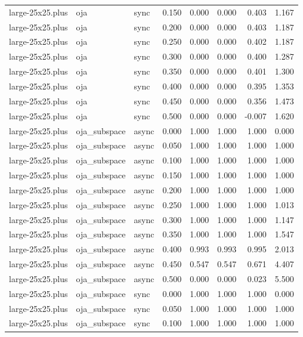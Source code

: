 \begin{tabular}{lllrrrrr}
large-25x25.plus & oja & sync & 0.150 & 0.000 & 0.000 & 0.403 & 1.167 \\
large-25x25.plus & oja & sync & 0.200 & 0.000 & 0.000 & 0.403 & 1.187 \\
large-25x25.plus & oja & sync & 0.250 & 0.000 & 0.000 & 0.402 & 1.187 \\
large-25x25.plus & oja & sync & 0.300 & 0.000 & 0.000 & 0.400 & 1.287 \\
large-25x25.plus & oja & sync & 0.350 & 0.000 & 0.000 & 0.401 & 1.300 \\
large-25x25.plus & oja & sync & 0.400 & 0.000 & 0.000 & 0.395 & 1.353 \\
large-25x25.plus & oja & sync & 0.450 & 0.000 & 0.000 & 0.356 & 1.473 \\
large-25x25.plus & oja & sync & 0.500 & 0.000 & 0.000 & -0.007 & 1.620 \\
large-25x25.plus & oja\_subspace & async & 0.000 & 1.000 & 1.000 & 1.000 & 0.000 \\
large-25x25.plus & oja\_subspace & async & 0.050 & 1.000 & 1.000 & 1.000 & 1.000 \\
large-25x25.plus & oja\_subspace & async & 0.100 & 1.000 & 1.000 & 1.000 & 1.000 \\
large-25x25.plus & oja\_subspace & async & 0.150 & 1.000 & 1.000 & 1.000 & 1.000 \\
large-25x25.plus & oja\_subspace & async & 0.200 & 1.000 & 1.000 & 1.000 & 1.000 \\
large-25x25.plus & oja\_subspace & async & 0.250 & 1.000 & 1.000 & 1.000 & 1.013 \\
large-25x25.plus & oja\_subspace & async & 0.300 & 1.000 & 1.000 & 1.000 & 1.147 \\
large-25x25.plus & oja\_subspace & async & 0.350 & 1.000 & 1.000 & 1.000 & 1.547 \\
large-25x25.plus & oja\_subspace & async & 0.400 & 0.993 & 0.993 & 0.995 & 2.013 \\
large-25x25.plus & oja\_subspace & async & 0.450 & 0.547 & 0.547 & 0.671 & 4.407 \\
large-25x25.plus & oja\_subspace & async & 0.500 & 0.000 & 0.000 & 0.023 & 5.500 \\
large-25x25.plus & oja\_subspace & sync & 0.000 & 1.000 & 1.000 & 1.000 & 0.000 \\
large-25x25.plus & oja\_subspace & sync & 0.050 & 1.000 & 1.000 & 1.000 & 1.000 \\
large-25x25.plus & oja\_subspace & sync & 0.100 & 1.000 & 1.000 & 1.000 & 1.000 \\

\end{tabular}
